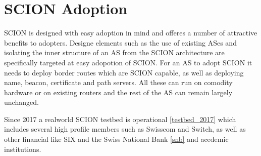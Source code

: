 \documentclass[../eva1_scion.tex]{subfiles}
\begin{document}
    \section{SCION Adoption}
    SCION is designed with easy adoption in mind and offeres a number of attractive benefits to adopters. Designe elements such as the use of existing ASes and isolating the inner structure of an AS from the SCION architecture are specifically targeted at easy adopotion of SCION. For an AS to adopt SCION it needs to deploy border routes which are SCION capable, as well as deploying name, beacon, certificate and path servers. All these can run on comodity hardware or on existing routers and the rest of the AS can remain largely unchanged.

    Since 2017  a realworld SCION testbed is operational \ref{testbed_2017} which includes several high profile members such as Swisscom and Switch, as well as other financial like SIX and the Swiss National Bank \ref{snb} and acedemic institutions.
\end{document}
